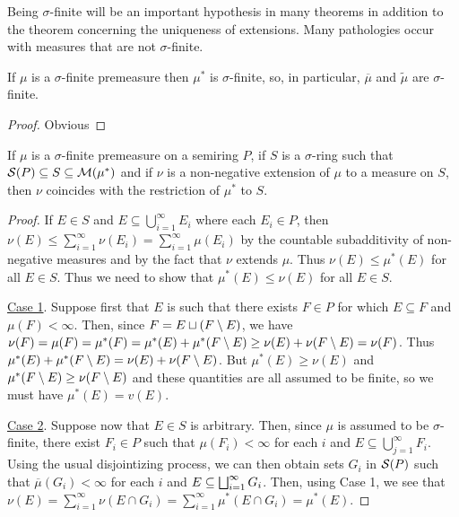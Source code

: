 Being $\sigma$-finite will be an important hypothesis in many theorems in addition to the theorem concerning the uniqueness of extensions. Many pathologies occur with measures that are not $\sigma$-finite.

\begin{proposition}
If $\mu$ is a $\sigma$-finite premeasure then $\mu^*$ is $\sigma$-finite, so, in particular, $\overline{\mu}$ and $\widetilde{\mu}$ are $\sigma$-finite.
\end{proposition}
\begin{proof}
Obvious
\end{proof}

\begin{theorem}\label{thm:unique extension}
If $\mu$ is a $\sigma$-finite premeasure on a semiring $P$, if $S$ is a $\sigma$-ring such that ${\cal S}(P)\subseteq S\subseteq {\cal M}(\mu^*)$ and if $\nu$ is a non-negative extension of $\mu$ to a measure on ${S}$, then $\nu$ coincides with the restriction of $\mu^*$ to ${S}$.
\end{theorem}

\begin{proof}
If $E \in S$ and $E \subseteq \bigcup_{i=1}^\infty E_i$ where each $E_i \in P$, then $\nu(E) \leq \sum_{i=1}^\infty \nu(E_i)=\sum_{i=1}^\infty \mu(E_i)$ by the countable subadditivity of non-negative measures and by the fact that $\nu$ extends $\mu$. Thus $\nu(E) \leq \mu^*(E)$ for all $E \in S$. Thus we need to show that $\mu^*(E) \leq \nu(E)$ for all $E \in S$.

\underline{Case 1}. Suppose first that $E$ is such that there exists $F \in P$ for which $E \subseteq F$ and $\mu(F)<\infty$. Then, since $F=E \sqcup(F\setminus E)$, we have $\nu(F)=\mu(F)=\mu^*(F)=\mu^*(E)+\mu^*(F\setminus E) \geq \nu(E)+\nu(F\setminus E)=\nu(F)$. Thus $\mu^*(E)+\mu^*(F\setminus E)=\nu(E)+\nu(F\setminus E)$. But $\mu^*(E) \geq \nu(E)$ and $\mu^*(F\setminus E) \geq \nu(F\setminus E)$ and these quantities are all assumed to be finite, so we must have $\mu^*(E)=v(E) .$

\underline{Case 2}. Suppose now that $E \in S$ is arbitrary. Then, since $\mu$ is assumed to be $\sigma$-finite, there exist $F_i \in P$ such that $\mu(F_i)<\infty$ for each $i$ and $E\subseteq\bigcup_{j=1}^\infty F_i .$ Using the usual disjointizing process, we can then obtain sets ${G}_i$ in ${\cal S}(P)$ such that $\overline{\mu}(G_i)<\infty$ for each $i$ and $E \subseteq \bigsqcup_{i=1}^\infty {G}_i$. Then, using Case 1, we see that $\nu(E)=\sum_{i=1}^\infty\nu(E\cap G_i)=\sum_{i=1}^\infty \mu^*(E \cap G_i)=\mu^*(E)$.
\end{proof}

